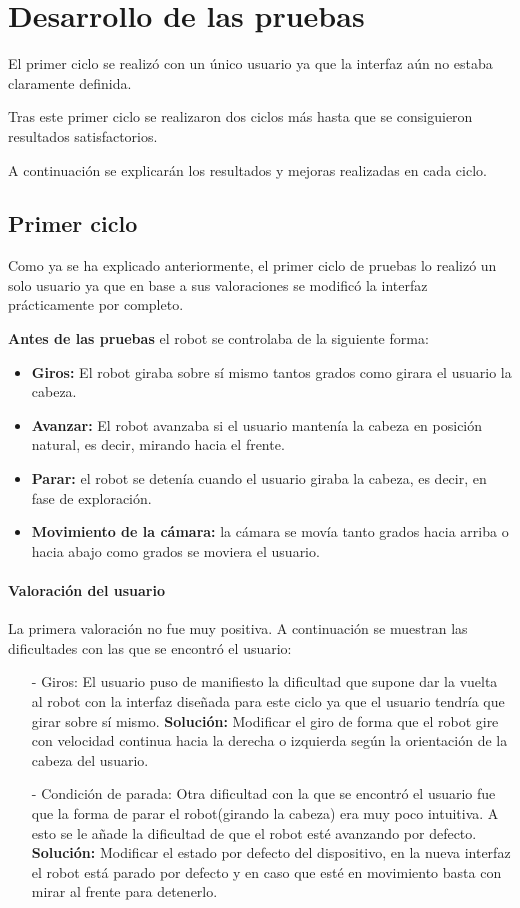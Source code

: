 \documentclass[twoside, 11pt]{epstfg}
\begin{document}
\section{Desarrollo de las pruebas}
El primer ciclo se realizó con un único usuario ya que la interfaz aún no estaba claramente definida.

Tras este primer ciclo se realizaron dos ciclos más hasta que se consiguieron resultados satisfactorios.

A continuación se explicarán los resultados y mejoras realizadas en cada ciclo.

\subsection{Primer ciclo}

Como ya se ha explicado anteriormente, el primer ciclo de pruebas lo realizó un solo usuario ya que en base a sus valoraciones se modificó la interfaz prácticamente por completo.

\textbf{Antes de las pruebas} el robot se controlaba de la siguiente forma:
\begin{itemize}
	\item \textbf{Giros:} El robot giraba sobre sí mismo tantos grados como girara el usuario la cabeza.
	\item \textbf{Avanzar:} El robot avanzaba si el usuario mantenía la cabeza en posición natural, es decir, mirando hacia el frente.
	\item \textbf{Parar:} el robot se detenía cuando el usuario giraba la cabeza, es decir, en fase de exploración.
	\item \textbf{Movimiento de la cámara:} la cámara se movía tanto grados hacia arriba o hacia abajo como grados se moviera el usuario.
\end{itemize}

\paragraph{Valoración del usuario}
La primera valoración no fue muy positiva. A continuación se muestran las dificultades con las que se encontró el usuario:

\begin{itemize}
	\item [ - ] Giros: El usuario puso de manifiesto la dificultad que supone dar la vuelta al robot con la interfaz diseñada para este ciclo ya que el usuario tendría que girar sobre sí mismo.
	\subitem \textbf{Solución:} Modificar el giro de forma que el robot gire con velocidad continua hacia la derecha o izquierda según la orientación de la cabeza del usuario. 
	\item [ - ] Condición de parada: Otra dificultad con la que se encontró el usuario fue que la forma de parar el robot(girando la cabeza) era muy poco intuitiva.  A esto se le añade la dificultad de que el robot esté avanzando por defecto.
	\subitem \textbf{Solución:} Modificar el estado por defecto del dispositivo, en la nueva interfaz el robot está parado por defecto y en caso que esté en movimiento basta con mirar al frente para detenerlo.
\end{itemize}
\end{document}
